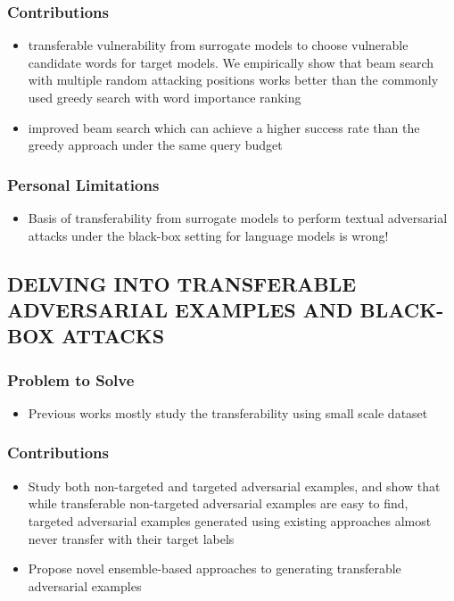 \documentclass{article}
\begin{document}
\begin{flushleft}
\subsubsection*{Contributions}
\begin{itemize}
  \item  transferable vulnerability from surrogate models to choose vulnerable candidate words for target models. We empirically show that beam search with multiple random attacking positions works better than the commonly used greedy search with word importance ranking
  \item improved beam search which can achieve a higher success rate than the greedy approach under the same query budget
\end{itemize}


\subsubsection*{Personal Limitations}
\begin{itemize}
    \item Basis of transferability from surrogate models to perform textual adversarial attacks under the black-box setting for language models is wrong!
\end{itemize}



 
 
\subsection{DELVING INTO TRANSFERABLE ADVERSARIAL EXAMPLES AND BLACK-BOX ATTACKS \cite{}} 
\subsubsection*{Problem to Solve}
\begin{itemize}
    \item Previous works mostly study the transferability using small scale dataset
\end{itemize}

\subsubsection*{Contributions}
\begin{itemize}
 \item Study both non-targeted and targeted adversarial examples, and show that while transferable non-targeted adversarial examples are easy to find, targeted adversarial examples generated using existing approaches almost never transfer with their target labels
\item Propose novel ensemble-based approaches to generating transferable adversarial examples
\end{itemize}


\end{flushleft}
\end{document}
